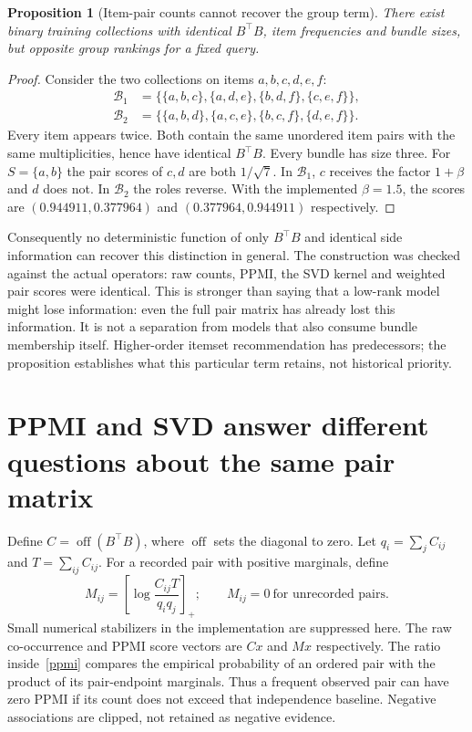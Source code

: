 \documentclass[11pt,a4paper]{article}
\newcommand{\off}{\operatorname{off}}
\newcommand{\pos}[1]{\left[#1\right]_+}
\newtheorem{proposition}{Proposition}
\begin{document}
\begin{proposition}[Item-pair counts cannot recover the group term]\label{loss}
There exist binary training collections with identical $B^\top B$, item
frequencies and bundle sizes, but opposite group rankings for a fixed query.
\end{proposition}
\begin{proof}
Consider the two collections on items $a,b,c,d,e,f$:
\begin{align*}
 \mathcal B_1&=\{\{a,b,c\},\{a,d,e\},\{b,d,f\},\{c,e,f\}\},\\
 \mathcal B_2&=\{\{a,b,d\},\{a,c,e\},\{b,c,f\},\{d,e,f\}\}.
\end{align*}
Every item appears twice. Both contain the same unordered item pairs with the
same multiplicities, hence have identical $B^\top B$. Every bundle has size three.
For $S=\{a,b\}$ the pair scores of $c,d$ are both $1/\sqrt7$. In $\mathcal B_1$,
$c$ receives the factor $1+\beta$ and $d$ does not. In $\mathcal B_2$ the roles
reverse. With the implemented $\beta=1.5$, the scores are
$(0.944911,0.377964)$ and $(0.377964,0.944911)$ respectively.
\end{proof}
Consequently no deterministic function of only $B^\top B$ and identical side
information can recover this distinction in general. The construction was checked
against the actual operators: raw counts, PPMI, the SVD kernel and weighted pair
scores were identical. This is stronger than saying that a low-rank model might
lose information: even the full pair matrix has already lost this information.
It is not a separation from models that also consume bundle membership itself.
Higher-order itemset recommendation has predecessors; the proposition establishes
what this particular term retains, not historical priority.

\section{PPMI and SVD answer different questions about the same pair matrix}
Define $C=\off(B^\top B)$, where $\off$ sets the diagonal to zero. Let
$q_i=\sum_jC_{ij}$ and $T=\sum_{ij}C_{ij}$. For a recorded pair with positive
marginals, define
\begin{equation}\label{ppmi}
 M_{ij}=\pos{\log\frac{C_{ij}T}{q_iq_j}};
 \qquad M_{ij}=0\ \text{for unrecorded pairs}.
\end{equation}
Small numerical stabilizers in the implementation are suppressed here. The raw
co-occurrence and PPMI score vectors are $Cx$ and $Mx$ respectively. The ratio
inside~\eqref{ppmi} compares the empirical probability of an ordered pair with
the product of its pair-endpoint marginals. Thus a frequent observed pair can have
zero PPMI if its count does not exceed that independence baseline. Negative
associations are clipped, not retained as negative evidence.
\end{document}
